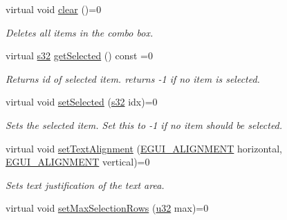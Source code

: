 \begin{DoxyCompactItemize}
virtual void \hyperlink{classirr_1_1gui_1_1IGUIComboBox_af9f5d813496af19af437a6f51fa7e029}{clear} ()=0
\begin{DoxyCompactList}\small\item\em Deletes all items in the combo box. \end{DoxyCompactList}\item 
\mbox{\label{classirr_1_1gui_1_1IGUIComboBox_a7cb6bb2a86fccfc78cbb3c3d56b88778}} 
virtual \hyperlink{namespaceirr_ac66849b7a6ed16e30ebede579f9b47c6}{s32} \hyperlink{classirr_1_1gui_1_1IGUIComboBox_a7cb6bb2a86fccfc78cbb3c3d56b88778}{get\+Selected} () const =0
\begin{DoxyCompactList}\small\item\em Returns id of selected item. returns -\/1 if no item is selected. \end{DoxyCompactList}\item 
\mbox{\label{classirr_1_1gui_1_1IGUIComboBox_a84660e6f4a677349ca7dc39024fe7b17}} 
virtual void \hyperlink{classirr_1_1gui_1_1IGUIComboBox_a84660e6f4a677349ca7dc39024fe7b17}{set\+Selected} (\hyperlink{namespaceirr_ac66849b7a6ed16e30ebede579f9b47c6}{s32} idx)=0
\begin{DoxyCompactList}\small\item\em Sets the selected item. Set this to -\/1 if no item should be selected. \end{DoxyCompactList}\item 
virtual void \hyperlink{classirr_1_1gui_1_1IGUIComboBox_a902681b9cfc783d29270f919ab3e71d8}{set\+Text\+Alignment} (\hyperlink{namespaceirr_1_1gui_a19eb5fb40e67f108cb16aba922ddaa2d}{E\+G\+U\+I\+\_\+\+A\+L\+I\+G\+N\+M\+E\+NT} horizontal, \hyperlink{namespaceirr_1_1gui_a19eb5fb40e67f108cb16aba922ddaa2d}{E\+G\+U\+I\+\_\+\+A\+L\+I\+G\+N\+M\+E\+NT} vertical)=0
\begin{DoxyCompactList}\small\item\em Sets text justification of the text area. \end{DoxyCompactList}\item 
\mbox{\label{classirr_1_1gui_1_1IGUIComboBox_a273f90cfe3cf279ccae2cc612117862d}} 
virtual void \hyperlink{classirr_1_1gui_1_1IGUIComboBox_a273f90cfe3cf279ccae2cc612117862d}{set\+Max\+Selection\+Rows} (\hyperlink{namespaceirr_a0416a53257075833e7002efd0a18e804}{u32} max)=0

\end{DoxyCompactItemize}
